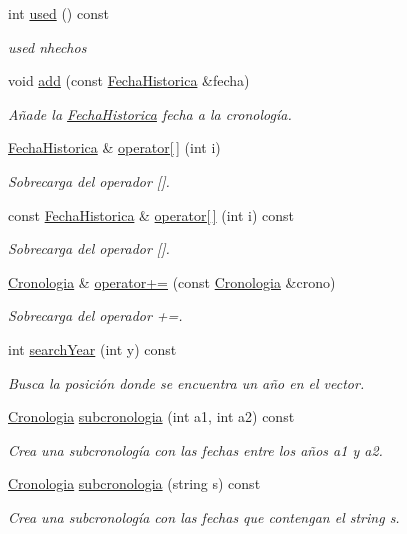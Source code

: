 \begin{DoxyCompactItemize}
int \hyperlink{classCronologia_a36024f9da51673ebcb5d3df90fdbf6ae}{used} () const
\begin{DoxyCompactList}\small\item\em used nhechos \end{DoxyCompactList}\item 
void \hyperlink{classCronologia_a6bb1e610054cf194005014767f7056d5}{add} (const \hyperlink{classFechaHistorica}{Fecha\+Historica} \&fecha)
\begin{DoxyCompactList}\small\item\em Añade la {\ttfamily \hyperlink{classFechaHistorica}{Fecha\+Historica}} {\itshape fecha} a la cronología. \end{DoxyCompactList}\item 
\hyperlink{classFechaHistorica}{Fecha\+Historica} \& \hyperlink{classCronologia_a61a7c1b52f071330a04f997c85ad208b}{operator\mbox{[}$\,$\mbox{]}} (int i)
\begin{DoxyCompactList}\small\item\em Sobrecarga del operador \mbox{[}\mbox{]}. \end{DoxyCompactList}\item 
const \hyperlink{classFechaHistorica}{Fecha\+Historica} \& \hyperlink{classCronologia_a0133e630439d19e13a8a928e914236fa}{operator\mbox{[}$\,$\mbox{]}} (int i) const
\begin{DoxyCompactList}\small\item\em Sobrecarga del operador \mbox{[}\mbox{]}. \end{DoxyCompactList}\item 
\hyperlink{classCronologia}{Cronologia} \& \hyperlink{classCronologia_a4423d0f1668c8af15811fc58a2c63335}{operator+=} (const \hyperlink{classCronologia}{Cronologia} \&crono)
\begin{DoxyCompactList}\small\item\em Sobrecarga del operador +=. \end{DoxyCompactList}\item 
int \hyperlink{classCronologia_a62515598c09d90d97ea36074c9722587}{search\+Year} (int y) const
\begin{DoxyCompactList}\small\item\em Busca la posición donde se encuentra un año en el vector. \end{DoxyCompactList}\item 
\hyperlink{classCronologia}{Cronologia} \hyperlink{classCronologia_a96a1e1d8eb1e51f09f1488e9100e2ed5}{subcronologia} (int a1, int a2) const
\begin{DoxyCompactList}\small\item\em Crea una subcronología con las fechas entre los años a1 y a2. \end{DoxyCompactList}\item 
\hyperlink{classCronologia}{Cronologia} \hyperlink{classCronologia_a59bc9f7828a6b9e34272c68cd49eb62c}{subcronologia} (string s) const
\begin{DoxyCompactList}\small\item\em Crea una subcronología con las fechas que contengan el string s. \end{DoxyCompactList}\end{DoxyCompactItemize}

